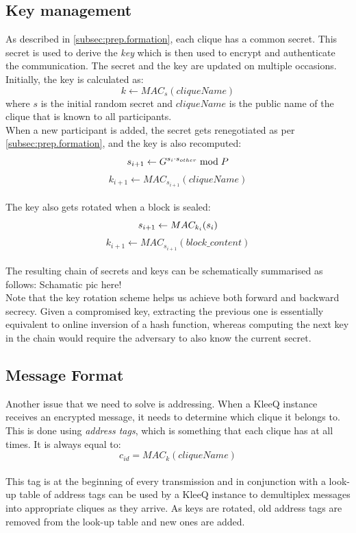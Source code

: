 \documentclass[a4paper, 12pt]{report}
\begin{document}
\subsection{Key management}
\label{subsec:prep.keyman}
As described in \cref{subsec:prep.formation}, each clique has a common secret. This secret is used to derive the \emph{key} which is then used to encrypt and authenticate the communication. The secret and the key are updated on multiple occasions. Initially, the key is calculated as:
\begin{equation*}
    k \leftarrow MAC_{s}(cliqueName)
\end{equation*}
where $s$ is the initial random secret and $cliqueName$ is the public name of the clique that is known to all participants. \\ 

When a new participant is added, the secret gets renegotiated as per \cref{subsec:prep.formation}, and the key is also recomputed: \\
\[
    s_{i+1} \leftarrow G^{s_i \cdot s_{other}} \bmod P  \\ 
\]
\[
    k_{i+1} \leftarrow MAC_{s_{i+1}}(cliqueName)
\] \\


The key also gets rotated when a block is sealed:
\[
    s_{i+1} \leftarrow MAC_{k_i}(s_i) \\ 
\]
\[
    k_{i+1} \leftarrow MAC_{s_{i+1}}(block\_content)
\] \\

The resulting chain of secrets and keys can be schematically summarised as follows:
{ 
    {\color{red} Schamatic pic here!}
} \\ 
Note that the key rotation scheme helps us achieve both forward and backward secrecy. Given a compromised key, extracting the previous one is essentially equivalent to online inversion of a hash function, whereas computing the next key in the chain would require the adversary to also know the current secret.


\subsection{Message Format}
\label{ssec:prep.proto.msg_fmt}
Another issue that we need to solve is addressing. When a KleeQ instance receives an encrypted message, it needs to determine which clique it belongs to. This is done using \emph{address tags}, which is something that each clique has at all times. It is always equal to:
\begin{equation*}
    c_{id} = MAC_{k}(cliqueName)
\end{equation*} \\
This tag is at the beginning of every transmission and in conjunction with a look-up table of address tags can be used by a KleeQ instance to demultiplex messages into appropriate cliques as they arrive. As keys are rotated, old address tags are removed from the look-up table and new ones are added.\\
\end{document}
